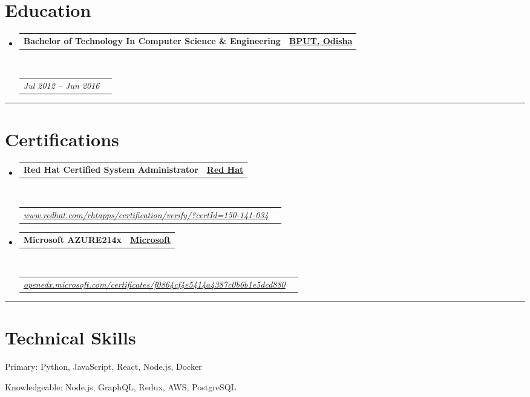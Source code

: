 \documentclass[10pt,a4paper,hidelinks]{article}
\makeatletter
\newenvironment{indentsection}[1]%
{\begin{list}{}%
	{\setlength{\leftmargin}{#1}}%
	\item[]%
}
{\end{list}}
\newcommand{\headerrow}[2]
{\begin{tabular*}{\linewidth}{l@{\extracolsep{\fill}}r}
	#1 &
	#2 \\
\end{tabular*}}
\makeatother
\begin{document}
\section*{Education}

\begin{itemize}
	\parskip=0.1em

	\item 
	\headerrow
		{\textbf{Bachelor of Technology In Computer Science \& Engineering}}
		{{\href{http://www.bput.ac.in/}{\textbf{BPUT, Odisha}}}}
	\\
	\headerrow
		{\emph{Jul 2012 -- Jun 2016}}
		{\emph{}}

\end{itemize}


\hrule
\vspace{-0.4em}
\section*{Certifications}

\begin{itemize}
	\parskip=0.1em

	\item 
	\headerrow
		{\textbf{Red Hat Certified System Administrator}}
		{{\href{https://www.redhat.com/}{\textbf{Red Hat}}}}
	\\
	\headerrow
	    {\emph{\href{https://www.redhat.com/rhtapps/certification/verify/?certId=150-141-034}{www.redhat.com/rhtapps/certification/verify/?certId=150-141-034}}}
		{\emph{}}
	
	\item 
	\headerrow
		{\textbf{Microsoft AZURE214x}}
		{{\href{https://www.microsoft.com/}{\textbf{Microsoft}}}}
	\\
	\headerrow
	    {\emph{\href{https://openedx.microsoft.com/certificates/f0864cf4e5414a4387c0b6b1e5dcd880}{openedx.microsoft.com/certificates/f0864cf4e5414a4387c0b6b1e5dcd880}}}
		{\emph{}}

\end{itemize}


\hrule
\vspace{-0.4em}
\section*{Technical Skills}

\begin{indentsection}{\parindent}
\begin{description*}
 	\item[Primary:]
  	Python, JavaScript, React, Node.js, Docker
  	\item[Knowledgeable:]
  	Node.js, GraphQL, Redux, AWS, PostgreSQL
\end{description*}
\end{indentsection}
\end{document}
